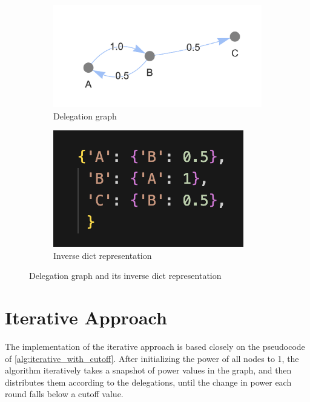 \begin{figure}[t]
    \centering
    \begin{subfigure}[t]{0.45\textwidth}
        \centering
        \includegraphics[width=\textwidth]{small_cycle_graph}
        \caption{Delegation graph}
    \end{subfigure}
    \hfill
    \begin{subfigure}[t]{0.45\textwidth}
        \centering
        \includegraphics[width=\textwidth]{small_cycle_graph_inverse_dict}
        \caption{Inverse dict representation}
    \end{subfigure}
    \caption{Delegation graph and its inverse dict representation}
    \label{fig:inverse_dict_example}
\end{figure}

\section{Iterative Approach}

The implementation of the iterative approach is based closely on the pseudocode of \cref{alg:iterative_with_cutoff}. After initializing the power of all nodes to 1, the algorithm iteratively takes a snapshot of power values in the graph, and then distributes them according to the delegations, until the change in power each round falls below a cutoff value. 

